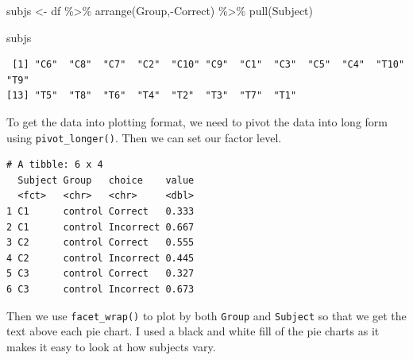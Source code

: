 \documentclass[
  letterpaper,
  DIV=11,
  numbers=noendperiod]{scrreprt}
\newenvironment{Shaded}{\begin{snugshade}}{\end{snugshade}}
\newcommand{\AttributeTok}[1]{\textcolor[rgb]{0.40,0.45,0.13}{#1}}
\newcommand{\DecValTok}[1]{\textcolor[rgb]{0.68,0.00,0.00}{#1}}
\newcommand{\FunctionTok}[1]{\textcolor[rgb]{0.28,0.35,0.67}{#1}}
\newcommand{\NormalTok}[1]{\textcolor[rgb]{0.00,0.23,0.31}{#1}}
\newcommand{\OtherTok}[1]{\textcolor[rgb]{0.00,0.23,0.31}{#1}}
\newcommand{\SpecialCharTok}[1]{\textcolor[rgb]{0.37,0.37,0.37}{#1}}
\newcommand{\StringTok}[1]{\textcolor[rgb]{0.13,0.47,0.30}{#1}}
\begin{document}
\begin{Shaded}
\begin{Highlighting}[]
\NormalTok{subjs }\OtherTok{\textless{}{-}}\NormalTok{ df }\SpecialCharTok{\%\textgreater{}\%}
  \FunctionTok{arrange}\NormalTok{(Group,}\SpecialCharTok{{-}}\NormalTok{Correct) }\SpecialCharTok{\%\textgreater{}\%}
  \FunctionTok{pull}\NormalTok{(Subject)}

\NormalTok{subjs}
\end{Highlighting}
\end{Shaded}

\begin{verbatim}
 [1] "C6"  "C8"  "C7"  "C2"  "C10" "C9"  "C1"  "C3"  "C5"  "C4"  "T10" "T9" 
[13] "T5"  "T8"  "T6"  "T4"  "T2"  "T3"  "T7"  "T1" 
\end{verbatim}

To get the data into plotting format, we need to pivot the data into
long form using \texttt{pivot\_longer()}. Then we can set our factor
level.

\begin{Shaded}
\end{Shaded}

\begin{verbatim}
# A tibble: 6 x 4
  Subject Group   choice    value
  <fct>   <chr>   <chr>     <dbl>
1 C1      control Correct   0.333
2 C1      control Incorrect 0.667
3 C2      control Correct   0.555
4 C2      control Incorrect 0.445
5 C3      control Correct   0.327
6 C3      control Incorrect 0.673
\end{verbatim}

Then we use \texttt{facet\_wrap()} to plot by both \texttt{Group} and
\texttt{Subject} so that we get the text above each pie chart. I used a
black and white fill of the pie charts as it makes it easy to look at
how subjects vary.
\end{document}
